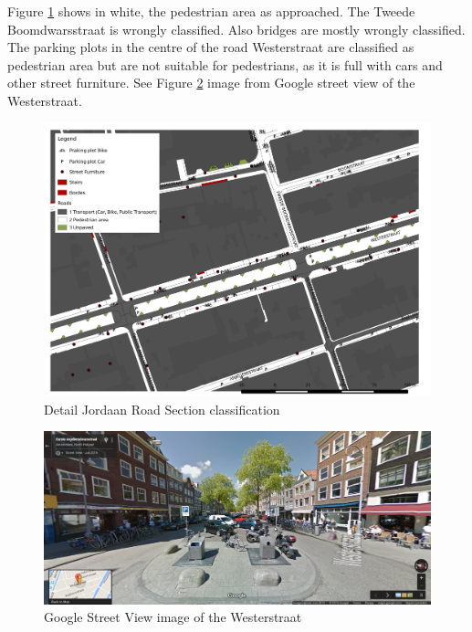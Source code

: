 Figure \ref{jordaanroad} shows in white, the pedestrian area as approached. The Tweede Boomdwarsstraat is wrongly classified. Also bridges are mostly wrongly classified. The parking plots in the centre of the road Westerstraat are classified as pedestrian area but are not suitable for pedestrians, as it is full with cars and other street furniture. See Figure \ref{westerstraat} image from Google street view of the Westerstraat. 

\begin{figure}[h]
\includegraphics[width=\textwidth]{img/R_Jordaan_weg_detail_resultat.pdf}
\centering
\caption{
Detail Jordaan Road Section classification\label{jordaanroad}}
\end{figure} 

\begin{figure}[h]
\includegraphics[width=\textwidth]{img/R_Westerstraat.png}
\centering
\caption{
Google Street View image of the Westerstraat\label{westerstraat}}
\end{figure} 


\clearpage

